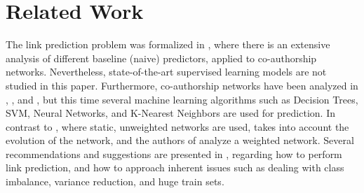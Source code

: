\documentclass{acm_proc_article-sp}
\begin{document}





\section{Related Work}
\label{Sect.3}

The link prediction problem was formalized in \cite{Liben-Nowell:2003:LPP:956863.956972}, where there is an extensive analysis of different baseline (naive) predictors, applied to co-authorship networks. Nevertheless, state-of-the-art supervised learning models are not studied in this paper. Furthermore, co-authorship networks have been analyzed in \cite{Hasan06linkprediction}, \cite{Pavlov:2007:FEL:2889513.2889517}, and \cite{de2011supervised}, but this time several machine learning algorithms such as Decision Trees, SVM, Neural Networks, and K-Nearest Neighbors are used for prediction. In contrast to \cite{Hasan06linkprediction}, where static, unweighted networks are used, \cite{Pavlov:2007:FEL:2889513.2889517} takes into account the evolution of the network, and the authors of \cite{de2011supervised} analyze a weighted network. Several recommendations and suggestions are presented in \cite{Lichtenwalter:2010:NPM:1835804.1835837}, regarding how to perform link prediction, and how to approach inherent issues such as dealing with class imbalance, variance reduction, and huge train sets. 
\end{document}
